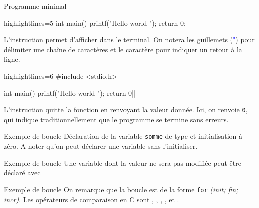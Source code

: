 \documentclass[10pt]{beamer}
\begin{document}
\begin{frame}[fragile]{\Ctitle}{\stitle}
\begin{exampleblock}{Programme minimal}
\begin{overprint}
\begin{langageC*}{highlightlines=5}
int main()
{
	printf("Hello world \n");
	return 0;
}
			\end{langageC*}
			\medskip
			L'instruction  permet d'afficher dans le terminal. On notera les guillemets (\textcolor{blue}{"}) pour délimiter une chaîne de caractères et le caractère  pour indiquer un retour à la ligne.
			\onslide<7>
			\begin{langageC*}{highlightlines=6}
#include <stdio.h>

int main()
{
	printf("Hello world \n");
	return 0|\myem{;}|
}
			\end{langageC*}
			\medskip
			L'instruction  quitte la fonction en renvoyant la valeur donnée. Ici, on renvoie {\tt 0}, qui indique traditionnellement que le programme se  termine sans erreurs.
		\end{overprint}
	\end{exampleblock}

\end{frame}

\begin{frame}{\Ctitle}{\stitle}
	\begin{exampleblock}{Exemple de boucle}
	\medskip
	Déclaration de la variable {\tt somme} de type  et initialisation à zéro. A noter qu'on peut déclarer une variable sans l'initialiser.
	\end{exampleblock}
\end{frame}

\begin{frame}{\Ctitle}{\stitle}
	\begin{exampleblock}{Exemple de boucle}
	\medskip
	Une variable dont la valeur ne sera pas modifiée peut être déclaré avec 
	\end{exampleblock}
\end{frame}

\begin{frame}{\Ctitle}{\stitle}
	\begin{exampleblock}{Exemple de boucle}
	\medskip
	On remarque que la boucle  est de la forme {\tt for} \textit{(init; fin; incr)}. Les opérateurs de comparaison en C sont \kw{==}, \kw{!=}, \kw{<}, \kw{>}, \kw{<=} et \kw{>=}.
	\end{exampleblock}
\end{frame}
\end{document}
